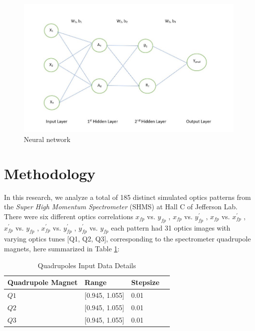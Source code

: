 \documentclass[conference]{IEEEtran}
\begin{document}
\begin{figure}[h]
    \centering
    \includegraphics[scale=0.22]{images/neural.jpeg}
    \caption{Neural network \cite{NN_Intro_TB_2020}}
    \label{fig:neuron_img.png}
\end{figure}



\section{Methodology}
\indent In this research, we analyze a total of 185 distinct simulated optics patterns from the \emph{Super High Momentum Spectrometer} (SHMS) at Hall C of Jefferson Lab.
There were six different optics correlations  $x_{fp}$ vs. $y_{fp}$  ,  $x_{fp}$ vs. $y^{'}_{fp}$  ,  $x_{fp}$ vs. $x^{'}_{fp}$  ,  $x^{'}_{fp}$ vs. $y_{fp}$  ,  $x^{'}_{fp}$ vs. $y^{'}_{fp}$  ,  $y^{'}_{fp}$ vs. $y_{fp}$  each pattern had 31 optics images with varying optics tunes [Q1, Q2, Q3], corresponding to the spectrometer quadrupole magnets, here summarized in Table \ref{tab:tune_stpSize}:

\begin{table}[h]
	\begin{center}
		\begin{tabular}{llll} %
                  \hline
                  Quadrupole Magnet & Range & Stepsize \\
                  \hline\hline
	          $Q1$ & [0.945, 1.055] & 0.01  \\
                  $Q2$ & [0.945, 1.055] & 0.01  \\
                  $Q3$ & [0.945, 1.055] & 0.01  \\                       
                  \hline 
		\end{tabular}
	\end{center}
	\caption{Quadrupoles Input Data Details}
	\label{tab:tune_stpSize}
\end{table}
\end{document}
